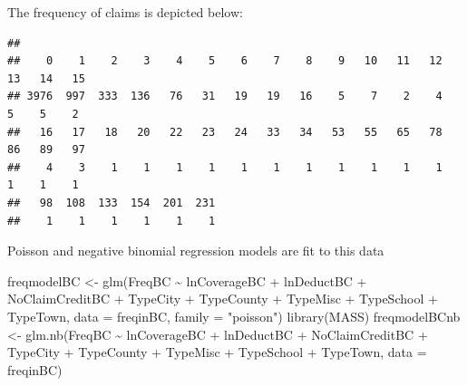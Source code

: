\documentclass[
  ignorenonframetext,
]{beamer}
\newenvironment{Shaded}{\begin{snugshade}}{\end{snugshade}}
\newcommand{\AttributeTok}[1]{\textcolor[rgb]{0.77,0.63,0.00}{#1}}
\newcommand{\FunctionTok}[1]{\textcolor[rgb]{0.00,0.00,0.00}{#1}}
\newcommand{\NormalTok}[1]{#1}
\newcommand{\OtherTok}[1]{\textcolor[rgb]{0.56,0.35,0.01}{#1}}
\newcommand{\SpecialCharTok}[1]{\textcolor[rgb]{0.00,0.00,0.00}{#1}}
\newcommand{\StringTok}[1]{\textcolor[rgb]{0.31,0.60,0.02}{#1}}
\begin{document}
\begin{frame}[fragile]{}
\protect\hypertarget{section}{}
The frequency of claims is depicted below: \vspace{12pt} \tiny

\begin{Shaded}
\end{Shaded}

\begin{verbatim}
## 
##    0    1    2    3    4    5    6    7    8    9   10   11   12   13   14   15 
## 3976  997  333  136   76   31   19   19   16    5    7    2    4    5    5    2 
##   16   17   18   20   22   23   24   33   34   53   55   65   78   86   89   97 
##    4    3    1    1    1    1    1    1    1    1    1    1    1    1    1    1 
##   98  108  133  154  201  231 
##    1    1    1    1    1    1
\end{verbatim}

\vspace{12pt}
\normalsize

Poisson and negative binomial regression models are fit to this data

\vspace{12pt}
\tiny

\begin{Shaded}
\begin{Highlighting}[]
\NormalTok{freqmodelBC }\OtherTok{\textless{}{-}} \FunctionTok{glm}\NormalTok{(FreqBC }\SpecialCharTok{\textasciitilde{}}\NormalTok{ lnCoverageBC }\SpecialCharTok{+}\NormalTok{ lnDeductBC }\SpecialCharTok{+}\NormalTok{ NoClaimCreditBC }\SpecialCharTok{+}
\NormalTok{                     TypeCity }\SpecialCharTok{+}\NormalTok{ TypeCounty }\SpecialCharTok{+}\NormalTok{ TypeMisc }\SpecialCharTok{+}\NormalTok{ TypeSchool }\SpecialCharTok{+}\NormalTok{ TypeTown,}
                   \AttributeTok{data =}\NormalTok{ freqinBC, }\AttributeTok{family =} \StringTok{"poisson"}\NormalTok{)}
\FunctionTok{library}\NormalTok{(MASS)}
\NormalTok{freqmodelBCnb }\OtherTok{\textless{}{-}} \FunctionTok{glm.nb}\NormalTok{(FreqBC }\SpecialCharTok{\textasciitilde{}}\NormalTok{ lnCoverageBC }\SpecialCharTok{+}\NormalTok{ lnDeductBC }\SpecialCharTok{+}\NormalTok{ NoClaimCreditBC }\SpecialCharTok{+}
\NormalTok{                     TypeCity }\SpecialCharTok{+}\NormalTok{ TypeCounty }\SpecialCharTok{+}\NormalTok{ TypeMisc }\SpecialCharTok{+}\NormalTok{ TypeSchool }\SpecialCharTok{+}\NormalTok{ TypeTown,}
                   \AttributeTok{data =}\NormalTok{ freqinBC)}
\end{Highlighting}
\end{Shaded}
\end{frame}
\end{document}
